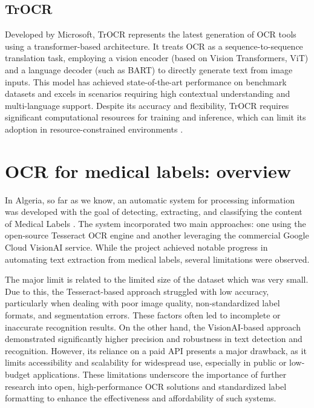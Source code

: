 \subsection*{TrOCR} Developed by Microsoft, TrOCR represents the latest generation of OCR tools using a transformer-based architecture. It treats OCR as a sequence-to-sequence translation task, employing a vision encoder (based on Vision Transformers, ViT) and a language decoder (such as BART) to directly generate text from image inputs. This model has achieved state-of-the-art performance on benchmark datasets and excels in scenarios requiring high contextual understanding and multi-language support. Despite its accuracy and flexibility, TrOCR requires significant computational resources for training and inference, which can limit its adoption in resource-constrained environments \cite{Li2021}.

\section{OCR for medical labels: overview }
In Algeria, so far as we know, an automatic system for processing information was developed with the goal of detecting, extracting, and classifying the content of Medical Labels \cite{meghatria2024}. The system incorporated two main approaches: one using the open-source Tesseract OCR engine and another leveraging the commercial Google Cloud VisionAI service. While the project achieved notable progress in automating text extraction from medical labels, several limitations were observed.

The major limit is related to the limited size of the dataset which was very small. Due to this, the Tesseract-based approach struggled with low accuracy, particularly when dealing with poor image quality, non-standardized label formats, and segmentation errors. These factors often led to incomplete or inaccurate recognition results. On the other hand, the VisionAI-based approach demonstrated significantly higher precision and robustness in text detection and recognition. However, its reliance on a paid API presents a major drawback, as it limits accessibility and scalability for widespread use, especially in public or low-budget applications. These limitations underscore the importance of further research into open, high-performance OCR solutions and standardized label formatting to enhance the effectiveness and affordability of such systems.%


